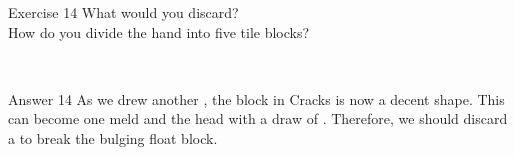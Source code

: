 \vfill

\begin{itembox}[l]{Exercise 14}
What would you discard? \\
\vsp
How do you divide the hand into five tile blocks? 

\vspace{-30pt}
\bp
{}\\ \vspace{-18pt}
\rfw{}
\ep
\end{itembox}

\newpage

\begin{itembox}[r]{Answer 14}
\emj
As we drew another {\large{}}, the block in Cracks is now a decent shape. This can become one meld and the head with a draw of {\large{}   }. Therefore, we should discard a {\large{}} to break the bulging float block. 
\end{itembox}

